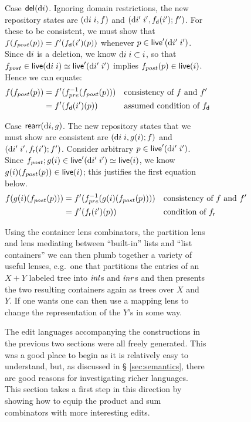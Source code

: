 \begin{figure}
\begin{figure}
\begin{pf}
  Case $\mathsf{del}(\textrm{d} i)$. Ignoring domain restrictions, the new repository states
  are $(\textrm{d} i\;i,f)$ and $(\textrm{d} i'\;i',f_{\mathsf{d}}(i');f')$. For these to be consistent,
  we must show that $f(f_{post}(p)) = f'(f_{\mathsf{d}}(i')(p))$ whenever $p \in
  \mathsf{live}'(\textrm{d} i'\;i')$. Since $\textrm{d} i$ is a deletion, we know $\textrm{d} i\;i \subset i$,
  so that $f_{post} \in \mathsf{live}(\textrm{d} i\;i) \simeq \mathsf{live}'(\textrm{d} i'\;i')$ implies
  $f_{post}(p) \in \mathsf{live}(i)$. Hence we can equate:
  \begin{align*}
      f(f_{post}(p)) &= f'(f_{pre}^{-1}(f_{post}(p)))
          &&\mbox{consistency of }f\mbox{ and }f'\\
      &= f'(f_{\mathsf{d}}(i')(p)) &&\mbox{assumed condition of }f_{\mathsf{d}}
  \end{align*}

  Case $\mathsf{rearr}(\textrm{d} i,g)$. The new repository states that we must show
  are consistent are $(\textrm{d} i\;i,g(i);f)$ and $(\textrm{d} i'\;i',f_{\mathsf{r}}(i');f')$. Consider
  arbitrary $p \in \mathsf{live}'(\textrm{d} i'\;i')$. Since $f_{post};g(i) \in
  \mathsf{live}'(\textrm{d} i'\;i') \simeq \mathsf{live}(i)$, we know $g(i)(f_{post}(p)) \in
  \mathsf{live}(i)$; this justifies the first equation below.
    \begin{align*}
        f(g(i)(f_{post}(p))) &= f'(f_{pre}^{-1}(g(i)(f_{post}(p))))
            &&\mbox{consistency of }f\mbox{ and }f' \\
        &= f'(f_{\mathsf{r}}(i')(p))
            &&\mbox{condition of }f_{\mathsf{r}}
    \end{align*}
\baselineskip
\end{pf}
\fi

\iffull Using the container lens combinators, the
partition lens and
lens mediating between ``built-in'' lists and ``list containers'' we
can then plumb together a variety of useful lenses, e.g.\ one that
partitions the entries of an $X+Y$ labeled tree into $\mathit{inl}$s and
$\mathit{inr}$s and then presents the two resulting containers again as trees
over $X$ and $Y$. If one wants one can then use a mapping lens to
change the representation of the $Y$'s in some way.
\fi

\label{sec:monoid-laws}

The edit languages accompanying the constructions in the previous two
sections were all freely generated.  This was a good place to begin as it
is relatively easy to understand, but, as discussed in \S
\ref{sec:semantics}, there are good reasons for investigating richer
languages.  This section takes a first step in this direction by showing how
to equip the product and sum combinators with more interesting edits. 


\end{figure}
\end{figure}
